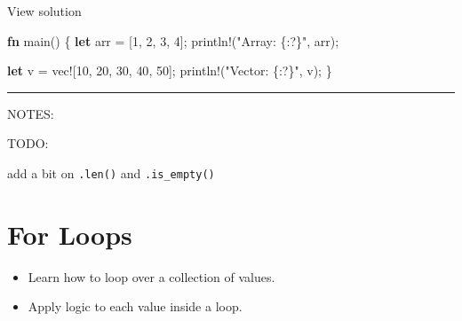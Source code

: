 \documentclass[
  letterpaper,
  DIV=11,
  numbers=noendperiod,
  oneside]{scrreprt}
\newenvironment{Shaded}{\begin{snugshade}}{\end{snugshade}}
\newcommand{\DecValTok}[1]{\textcolor[rgb]{0.68,0.00,0.00}{#1}}
\newcommand{\KeywordTok}[1]{\textcolor[rgb]{0.00,0.23,0.31}{\textbf{#1}}}
\newcommand{\NormalTok}[1]{\textcolor[rgb]{0.00,0.23,0.31}{#1}}
\newcommand{\OperatorTok}[1]{\textcolor[rgb]{0.37,0.37,0.37}{#1}}
\newcommand{\PreprocessorTok}[1]{\textcolor[rgb]{0.68,0.00,0.00}{#1}}
\newcommand{\StringTok}[1]{\textcolor[rgb]{0.13,0.47,0.30}{#1}}
\providecommand{\tightlist}{%
  \setlength{\itemsep}{0pt}\setlength{\parskip}{0pt}}\usepackage{longtable,booktabs,array}
\begin{document}
View solution

\begin{Shaded}
\begin{Highlighting}[]
\KeywordTok{fn}\NormalTok{ main() }\OperatorTok{\{}
    \KeywordTok{let}\NormalTok{ arr }\OperatorTok{=}\NormalTok{ [}\DecValTok{1}\OperatorTok{,} \DecValTok{2}\OperatorTok{,} \DecValTok{3}\OperatorTok{,} \DecValTok{4}\NormalTok{]}\OperatorTok{;}
    \PreprocessorTok{println!}\NormalTok{(}\StringTok{"Array: \{:?\}"}\OperatorTok{,}\NormalTok{ arr)}\OperatorTok{;}

    \KeywordTok{let}\NormalTok{ v }\OperatorTok{=} \PreprocessorTok{vec!}\NormalTok{[}\DecValTok{10}\OperatorTok{,} \DecValTok{20}\OperatorTok{,} \DecValTok{30}\OperatorTok{,} \DecValTok{40}\OperatorTok{,} \DecValTok{50}\NormalTok{]}\OperatorTok{;}
    \PreprocessorTok{println!}\NormalTok{(}\StringTok{"Vector: \{:?\}"}\OperatorTok{,}\NormalTok{ v)}\OperatorTok{;}
\OperatorTok{\}}
\end{Highlighting}
\end{Shaded}

\begin{center}\rule{0.5\linewidth}{0.5pt}\end{center}

NOTES:

TODO:

add a bit on \texttt{.len()} and \texttt{.is\_empty()}

\chapter{For Loops}\label{for-loops}

\begin{tcolorbox}[enhanced jigsaw, titlerule=0mm, coltitle=black, opacitybacktitle=0.6, bottomrule=.15mm, bottomtitle=1mm, colframe=quarto-callout-tip-color-frame, toprule=.15mm, opacityback=0, rightrule=.15mm, leftrule=.75mm, breakable, left=2mm, colback=white, colbacktitle=quarto-callout-tip-color!10!white, toptitle=1mm, title=\textcolor{quarto-callout-tip-color}{\faLightbulb}\hspace{0.5em}{Objective}, arc=.35mm]

\begin{itemize}
\tightlist
\item
  Learn how to loop over a collection of values.
\item
  Apply logic to each value inside a loop.
\end{itemize}

\end{tcolorbox}
\end{document}
